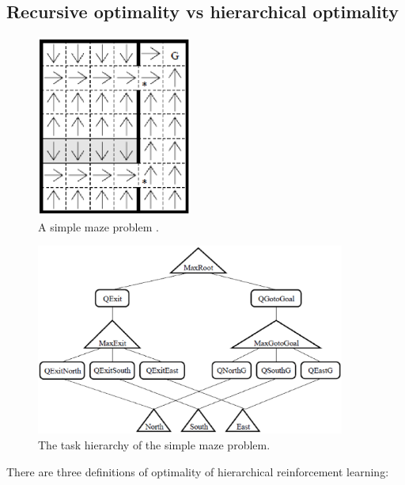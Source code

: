 \subsection{Recursive optimality vs hierarchical optimality}
\label{se:ROHO}
\begin{figure}[t]
\begin{center}
    \includegraphics[width=2in] {./figures/Maze.eps}
\end{center}
\caption{A simple maze problem \cite{MaxQJ}.}
\label{fig:Maze}
\end{figure}
\begin{figure}[t]
\begin{center}
    \includegraphics[width=4in] {./figures/MazeH.eps}
\end{center}
\caption{The task hierarchy of the simple maze problem.}
\label{fig:MazeH}
\end{figure}

There are three definitions of optimality of hierarchical reinforcement learning:

